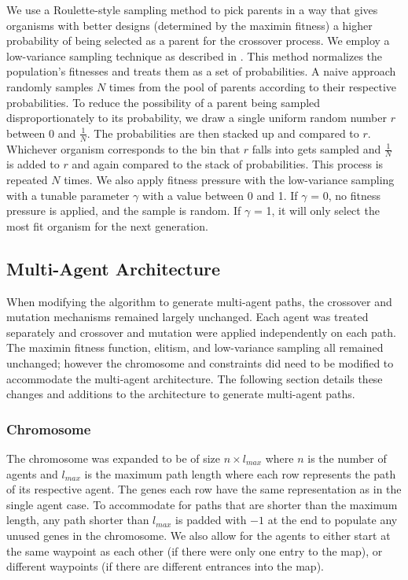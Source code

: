 \documentclass[letterpaper, 10 pt, conference]{ieeeconf}  %
\begin{document}
We use a Roulette-style sampling method to pick parents in a way that gives organisms with better designs (determined by the maximin fitness) a higher probability of being selected as a parent for the crossover process. We employ a low-variance sampling technique as described in \cite{Thrun}. This method normalizes the population's fitnesses and treats them as a set of probabilities. A naive approach randomly samples $N$ times from the pool of parents according to their respective probabilities. To reduce the possibility of a parent being sampled disproportionately to its probability, we draw a single uniform random number $r$ between 0 and $\tfrac{1}{N}$. The probabilities are then stacked up and compared to $r$. Whichever organism corresponds to the bin that $r$ falls into gets sampled and $\tfrac{1}{N}$ is added to $r$ and again compared to the stack of probabilities. This process is repeated $N$ times. We also apply fitness pressure with the low-variance sampling with a tunable parameter $\gamma$ with a value between 0 and 1. If $\gamma$ = 0, no fitness pressure is applied, and the sample is random. If $\gamma$ = 1, it will only select the most fit organism for the next generation.

\subsection{Multi-Agent Architecture}

When modifying the algorithm to generate multi-agent paths, the crossover and mutation mechanisms remained largely unchanged. Each agent was treated separately and crossover and mutation were applied independently on each path. The maximin fitness function, elitism, and low-variance sampling all remained unchanged; however the chromosome and constraints did need to be modified to accommodate the multi-agent architecture. The following section details these changes and additions to the architecture to generate multi-agent paths.

\subsubsection{Chromosome}
The chromosome was expanded to be of size $n \times l_{max}$ where $n$ is the number of agents and $l_{max}$ is the maximum path length where each row represents the path of its respective agent. The genes each row have the same representation as in the single agent case. To accommodate for paths that are shorter than the maximum length, any path shorter than $l_{max}$ is padded with $-1$ at the end to populate any unused genes in the chromosome. We also allow for the agents to either start at the same waypoint as each other (if there were only one entry to the map), or different waypoints (if there are different entrances into the map).
\end{document}
